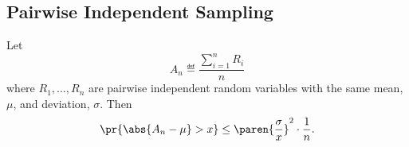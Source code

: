 \documentclass[handout]{mcs}
\begin{document}
{\subsection*{Pairwise Independent Sampling}

\begin{theorem*}
Let
\[
A_n \eqdef \frac{\sum_{i=1}^n R_i}{n}
\]
where $R_1, \dots, R_n$ are pairwise independent random variables with the
same mean, $\mu$, and deviation, $\sigma$.  Then
\begin{equation}\label{Sndev}
\pr{\abs{A_n - \mu} > x} \leq 
\paren{\frac{\sigma}{x}}^2 \cdot \frac{1}{n}.
\end{equation}
\end{theorem*}
\iffalse

\begin{proof}
By linearity of expectation,
\[
\expect{A_n} = \frac{\expect{\sum_{i=1}^n R_i}}{n}
   = \frac{\sum_{i=1}^n \expect{R_i}}{n}
   = \frac{n\mu}{n} = \mu.
\]

Since the $R_i$'s are pairwise independent, their variances will also add,
so
\begin{align*}
\variance{A_n}  = & \paren{\frac{1}{n}}^2 \variance{\sum_{i=1}^n R_i}
                        & \text{(by~\eqref{a2v})}\\
 = & \paren{\frac{1}{n}}^2 \sum_{i=1}^n \variance{R_i}
                        & \text{(additivity)}\\
 = & \paren{\frac{1}{n}}^2 n\sigma^2\\
 = & \frac{\sigma^2}{n}.
\end{align*}

Now letting $R$ be $A_n$ in Chebyshev's Bound~\eqref{Chb}
yields~\eqref{Sndev}, as required.

\end{proof}\fi

}
\end{document}
